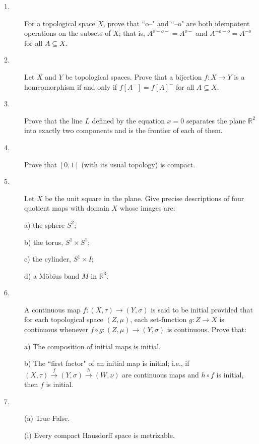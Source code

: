 \documentclass{article}
\def\R{\mathbb R}
\begin{document}
\begin{description}
\item[1.]
For a topological space $X$, prove that ``o--" and ``--o" are both idempotent
operations on the subsets of $X$; that is, $A^{o-o-} = A^{o-}$ and
$A^{-o-o} = A^{-o}$ for all $A \subseteq X$.

\item[2.]
Let $X$ and $Y$ be topological spaces. Prove that a bijection $f: X \to Y$
is a homeomorphism if and only if $f[A^-] = f[A]^-$ for all $A \subseteq X$.

\item[3.]
Prove that the line $L$ defined by the equation $x=0$ separates the plane
$\R^2$ into exactly two components and is the frontier of each of them.

\item[4.]
Prove that $[0,1]$ (with its usual topology) is compact.

\item[5.]
Let $X$ be the unit square in the plane. Give precise descriptions of four
quotient maps with domain $X$ whose images are:

\item[\quad] a)
the sphere $S^2$;

\item[\quad] b)
the torus, $S^1 \times S^1$;

\item[\quad] c)
the cylinder, $S^1 \times I$;

\item[\quad] d)
a M\"obius band $M$ in $\R^3$.

\item[6.]
A continuous map $f: (X, \tau) \to (Y, \sigma)$ is said to be initial
provided that for each topological space $(Z, \mu)$, each set-function
$g:Z \to X$ is continuous whenever $f \circ g : (Z, \mu) \to (Y, \sigma)$
is continuous. Prove that:

\item[\quad] a)
The composition of initial maps is initial.

\item[\quad] b)
The ``first factor" of an initial map is initial; i.e., if
$(X, \tau) \stackrel{f}{\to} (Y, \sigma) \stackrel{h}{\to} (W, \nu)$
are continuous maps and $h \circ f$ is initial, then $f$ is initial.

\item[7.] (a)
True-False.

\item[\qquad] (i)
Every compact Hausdorff space is metrizable.


\end{description}
\end{document}

